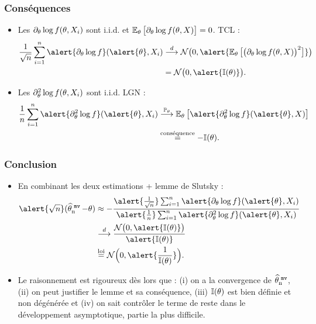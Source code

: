 \begin{frame}
\frametitle{Conséquences}
\begin{itemize}
\item Les $\partial_\theta \log f(\theta, X_i)$ sont i.i.d. et $\operatorname{{\mathbb E}}_\theta \big[\partial_\theta \log f(\theta, X)\big]=0$. TCL :
\begin{align*}\frac{1}{\sqrt{n}} \sum_{i = 1}^n \alert{\partial_\truetheta \log f}(\alert{\truetheta}, X_i) & \stackrel{d}{\longrightarrow} \mathcal N\big(0, \alert{\E_\truetheta \big[\big(\partial_\truetheta \log f(\truetheta, X)\big)^2\big]}\big)\\
& = {\mathcal N}\big(0,\alert{\mathbb{I}(\truetheta)}\big).
\end{align*}
\item Les $\partial_\theta^2 \log f(\theta, X_i)$ sont i.i.d. LGN :
\begin{align*}
\frac{1}{n}\sum_{i = 1}^n \alert{\partial_\truetheta^2 \log f}(\alert{\truetheta}, X_i) & \stackrel{\PP_\truetheta}{\longrightarrow}
\E_\truetheta\big[\alert{\partial_\truetheta^2\log f}(\alert{\truetheta}, X)\big] \\
&\stackrel{\text{conséquence}}{=}-\mathbb{I}(\truetheta).
\end{align*}
\end{itemize}
\end{frame}

\begin{frame}
\frametitle{Conclusion}
\begin{itemize}
\item En combinant les deux estimations + lemme de Slutsky :
\begin{align*}
\alert{\sqrt{n}}(\estMV-\truetheta) & \approx -\frac{\alert{\frac{1}{\sqrt{n}}}\sum_{i = 1}^n \alert{\partial_\truetheta \log f}(\alert{\truetheta}, X_i)}{\alert{\frac{1}{n}} \sum_{i = 1}^n \alert{\partial^2_\truetheta \log f}(\alert{\truetheta}, X_i)}\\
& \stackrel{d}{\longrightarrow} \frac{{\mathcal N}\big(0,\alert{\mathbb{I}(\truetheta)}\big)}{\alert{\mathbb{I}(\truetheta)}} \\
& \stackrel{\text{loi}}{=} {\mathcal N}\Big(0,\alert{\frac{1}{\mathbb{I}(\truetheta)}}\Big).
\end{align*}
\item Le raisonnement est \alert{ rigoureux dès lors que} : (i) on a la convergence de $\operatorname{\widehat \theta_n^{\,\,{\tt mv}}}$, (ii) on peut justifier le lemme et sa conséquence, (iii) $\mathbb{I}(\theta)$ est bien définie et non dégénérée et (iv) on sait contrôler le terme de reste dans le développement asymptotique, \alert{partie la plus difficile}.
\end{itemize}
\end{frame}


